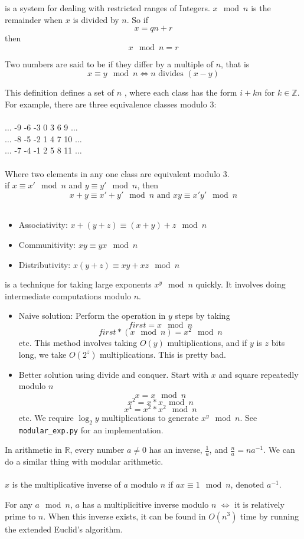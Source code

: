  is a system for dealing with restricted ranges of Integers. $x \mod{n}$ is
the remainder when $x$ is divided by $n$. So if 
$$x = qn + r$$
then
$$x \mod{n} = r$$

Two numbers are said to be  if they differ by a multiple of $n$, that is
$$ x \equiv y \mod{n} \iff n \text{ divides } (x - y)$$ 

This definition defines a set of $n$ , where each class has the form $i + kn$ for $k \in \mathbb{Z}$.
For example, there are three equivalence classes modulo 3: \\\\
	 $\ldots$ -9 -6 -3 0 3 6 9 $\ldots$\\
	$\ldots$ -8 -5 -2 1 4 7 10 $\ldots$\\
	$\ldots$ -7 -4 -1 2 5 8 11 $\ldots$\\\\
Where two elements in any one class are equivalent modulo 3.\\

 if $x \equiv x' \mod{n}$ and $y \equiv y' \mod{n}$, then
$$ x + y \equiv x' + y' \mod{n} \text{ and } xy \equiv x'y' \mod{n}$$
\\
\begin{itemize}
	\item Associativity: $x + (y + z) \equiv (x + y) + z \mod{n}$
	\item Communitivity: $xy \equiv yx \mod{n}$
	\item Distributivity: $x(y + z) \equiv xy + xz \mod{n}$
\end{itemize}

 is a technique for taking large exponents $x^y \mod{n}$ quickly. It involves doing intermediate computations modulo $n$.
\begin{itemize}
	\item Naive solution: Perform the operation in $y$ steps by taking
		$$ first = x \mod {n}$$
		$$ first * (x \mod {n}) = x^2 \mod{n}$$
		etc. This method involves taking $O(y)$ multiplications, and if $y$ is $z$ bits long, we take $O(2^z)$ multiplications. This is pretty bad.
	\item Better solution using divide and conquer. Start with $x$ and square repeatedly modulo $n$
		$$ x = x \mod{n}$$
		$$ x^2 = x*x \mod{n}$$
		$$ x^4 = x^2*x^2 \mod{n}$$
		etc. We require $\log_2{y}$ multiplications to generate $x^y \mod{n}$. See \texttt{modular\_exp.py} for an implementation.
\end{itemize}

In arithmetic in $\mathbb{R}$, every number $a \ne 0$ has an inverse, $\frac{1}{a}$, and $\frac{n}{a} = na^{-1}$. We can do a similar thing with modular arithmetic.\\\\

$x$ is the multiplicative inverse of $a$ modulo $n$ if $ax \equiv 1 \mod{n}$, denoted $a^{-1}$. 

 For any $a \mod{n}$, $a$ has a multiplicitive inverse modulo $n$ $\iff$ it is relatively prime to $n$. When this inverse exists, it can be found in $O(n^3)$ time by running the extended Euclid's algorithm.